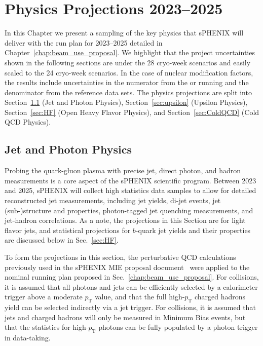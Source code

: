 \chapter{Physics Projections 2023--2025}
\label{chap:physics_projections}

In this Chapter we present a sampling of the key physics that sPHENIX will deliver with the run plan for 2023--2025 detailed in Chapter~\ref{chap:beam_use_proposal}.    We highlight that the project uncertainties shown in the following sections are under the 28 cryo-week scenarios and easily scaled to the 24 cryo-week scenarios.  In the case of nuclear modification factors, the results include uncertainties in the numerator from the \auau or \pau running and the denominator from the \pp reference data sets.   The physics projections are split into Section~\ref{sec:jet} (Jet and Photon Physics), Section~\ref{sec:upsilon} (Upsilon Physics), Section~\ref{sec:HF} (Open Heavy Flavor Physics), and Section~\ref{sec:ColdQCD} (Cold QCD Physics).

\section{Jet and Photon Physics}
\label{sec:jet}

Probing the quark-gluon plasma with precise jet, direct photon, and hadron measurements is a core aspect of the sPHENIX scientific program. Between 2023 and 2025, sPHENIX will collect high statistics data samples to allow for detailed reconstructed jet measurements, including jet yields, di-jet events, jet (sub-)structure and properties, photon-tagged jet quenching measurements, and jet-hadron correlations. As a note, the projections in this Section are for light flavor jets, and statistical projections for $b$-quark jet yields and their properties are discussed below in Sec.~\ref{sec:HF}. 

To form the projections in this section, the perturbative QCD calculations previously used in the sPHENIX MIE proposal document~\cite{Adare:2015kwa} were applied to the nominal running plan proposed in Sec.~\ref{chap:beam_use_proposal}. 
For \pp collisions, it is assumed that all photons and jets can be efficiently selected by a calorimeter trigger above a moderate $p_\mathrm{T}$ value, and that the full high-$p_\mathrm{T}$ charged hadrons yield can be selected indirectly via a jet trigger. For \auau collisions, it is assumed that jets and charged hadrons will only be measured in Minimum Bias events, but that the statistics for high-$p_\mathrm{T}$ photons can be fully populated by a photon trigger in \auau data-taking.

